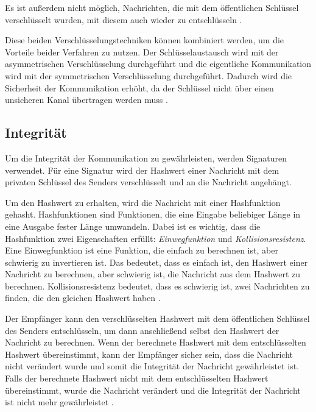 \noindent Es ist außerdem nicht möglich, Nachrichten, die mit dem öffentlichen Schlüssel verschlüsselt wurden, mit diesem auch wieder zu entschlüsseln \parencite{ElektronikKompendium_asymmetrischeVerschluesselung}. 

Diese beiden Verschlüsselungstechniken können kombiniert werden, um die Vorteile beider Verfahren zu nutzen. Der Schlüsselaustausch wird mit der asymmetrischen Verschlüsselung durchgeführt und die eigentliche Kommunikation wird mit der symmetrischen Verschlüsselung durchgeführt. Dadurch wird die Sicherheit der Kommunikation erhöht, da der Schlüssel nicht über einen unsicheren Kanal übertragen werden muss \Parencite[S. 5-8]{Wong_KryptoPraxis}. 

\subsection{Integrität}

Um die Integrität der Kommunikation zu gewährleisten, werden Signaturen verwendet. Für eine Signatur wird der Hashwert einer Nachricht mit dem privaten Schlüssel des Senders verschlüsselt und an die Nachricht angehängt. 

Um den Hashwert zu erhalten, wird die Nachricht mit einer Hashfunktion gehasht. Hashfunktionen sind Funktionen, die eine Eingabe beliebiger Länge in eine Ausgabe fester Länge umwandeln. Dabei ist es wichtig, dass die Hashfunktion zwei Eigenschaften erfüllt: \textit{Einwegfunktion} und \textit{Kollisionsresistenz}. Eine Einwegfunktion ist eine Funktion, die einfach zu berechnen ist, aber schwierig zu invertieren ist. Das bedeutet, dass es einfach ist, den Hashwert einer Nachricht zu berechnen, aber schwierig ist, die Nachricht aus dem Hashwert zu berechnen. Kollisionsresistenz bedeutet, dass es schwierig ist, zwei Nachrichten zu finden, die den gleichen Hashwert haben \parencite[S. 13-15]{Brünnler_BlockchainKurzGut}.

Der Empfänger kann den verschlüsselten Hashwert mit dem öffentlichen Schlüssel des Senders entschlüsseln, um dann anschließend selbst den Hashwert der Nachricht zu berechnen. Wenn der berechnete Hashwert mit dem entschlüsselten Hashwert übereinstimmt, kann der Empfänger sicher sein, dass die Nachricht nicht verändert wurde und somit die Integrität der Nachricht gewährleistet ist. Falls der berechnete Hashwert nicht mit dem entschlüsselten Hashwert übereinstimmt, wurde die Nachricht verändert und die Integrität der Nachricht ist nicht mehr gewährleistet \Parencite[S. 73-78]{Hellmann_IT-Sicherheit}.


